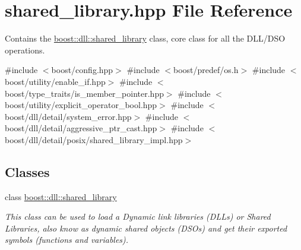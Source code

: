 \hypertarget{a00269}{}\section{shared\+\_\+library.\+hpp File Reference}
\label{a00269}


Contains the \hyperlink{a01708}{boost\+::dll\+::shared\+\_\+library} class, core class for all the D\+L\+L/\+D\+SO operations.  


{\ttfamily \#include $<$boost/config.\+hpp$>$}\newline
{\ttfamily \#include $<$boost/predef/os.\+h$>$}\newline
{\ttfamily \#include $<$boost/utility/enable\+\_\+if.\+hpp$>$}\newline
{\ttfamily \#include $<$boost/type\+\_\+traits/is\+\_\+member\+\_\+pointer.\+hpp$>$}\newline
{\ttfamily \#include $<$boost/utility/explicit\+\_\+operator\+\_\+bool.\+hpp$>$}\newline
{\ttfamily \#include $<$boost/dll/detail/system\+\_\+error.\+hpp$>$}\newline
{\ttfamily \#include $<$boost/dll/detail/aggressive\+\_\+ptr\+\_\+cast.\+hpp$>$}\newline
{\ttfamily \#include $<$boost/dll/detail/posix/shared\+\_\+library\+\_\+impl.\+hpp$>$}\newline
\subsection*{Classes}
\begin{DoxyCompactItemize}
\item 
class \hyperlink{a01708}{boost\+::dll\+::shared\+\_\+library}
\begin{DoxyCompactList}\small\item\em This class can be used to load a Dynamic link libraries (D\+LL\textquotesingle{}s) or Shared Libraries, also know as dynamic shared objects (D\+SO\textquotesingle{}s) and get their exported symbols (functions and variables). \end{DoxyCompactList}\end{DoxyCompactItemize}
